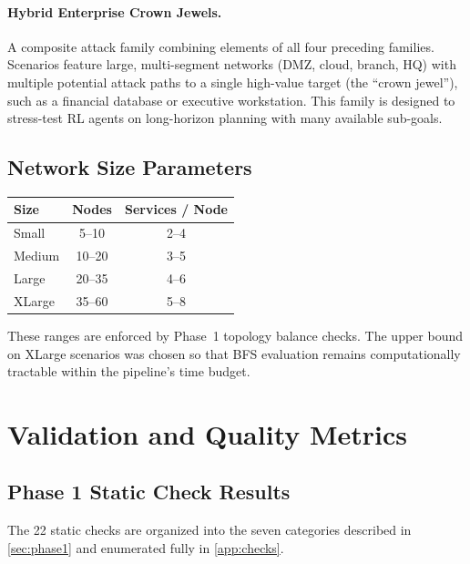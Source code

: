\documentclass[11pt,a4paper]{article}
\begin{document}
\paragraph{Hybrid Enterprise Crown Jewels.}
A composite attack family combining elements of all four preceding families.
Scenarios feature large, multi-segment networks (DMZ, cloud, branch, HQ)
with multiple potential attack paths to a single high-value target (the
``crown jewel''), such as a financial database or executive workstation.
This family is designed to stress-test RL agents on long-horizon planning
with many available sub-goals.

\subsection{Network Size Parameters}

\begin{center}
\begin{tabular}{@{}lcc@{}}
\toprule
\textbf{Size} & \textbf{Nodes} & \textbf{Services / Node} \\
\midrule
Small   & 5--10   & 2--4 \\
Medium  & 10--20  & 3--5 \\
Large   & 20--35  & 4--6 \\
XLarge  & 35--60  & 5--8 \\
\bottomrule
\end{tabular}
\end{center}

These ranges are enforced by Phase~1 topology balance checks.  The upper
bound on XLarge scenarios was chosen so that BFS evaluation remains
computationally tractable within the pipeline's time budget.

\section{Validation and Quality Metrics}
\label{sec:validation}

\subsection{Phase 1 Static Check Results}

The 22 static checks are organized into the seven categories described in
\cref{sec:phase1} and enumerated fully in \cref{app:checks}.
\end{document}
